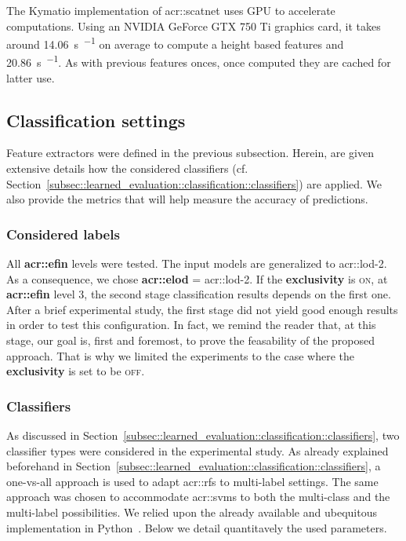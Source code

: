                 The Kymatio implementation of \gls{acr::scatnet} uses GPU to accelerate computations.
                Using an NVIDIA GeForce GTX 750 Ti graphics card, it takes around \SI{14.06}{\s \per \building} on average to compute a height based features and \SI{20.86}{\s \per \building}.
                As with previous features onces, once computed they are cached for latter use.

    \subsection{Classification settings}
        \label{subsec::experiments::setup::classification}
            Feature extractors were defined in the previous subsection.
            Herein, are given extensive details how the considered classifiers (cf. Section~\ref{subsec::learned_evaluation::classification::classifiers}) are applied.
            We also provide the metrics that will help measure the accuracy of predictions.

        \subsubsection{Considered labels}
            All \textbf{\gls{acr::efin}} levels were tested.
            The input models are generalized to \gls{acr::lod}-2.
            As a consequence, we chose \textbf{\gls{acr::elod}} = \gls{acr::lod}-2.
            If the \textbf{exclusivity} is \textsc{on}, at \textbf{\gls{acr::efin}} level 3, the second stage classification results depends on the first one.
            After a brief experimental study, the first stage did not yield good enough results in order to test this configuration.
            In fact, we remind the reader that, at this stage, our goal is, first and foremost, to prove the feasability of the proposed approach.
            That is why we limited the experiments to the case where the \textbf{exclusivity} is set to be \textsc{off}.

        \subsubsection{Classifiers}
            As discussed in Section~\ref{subsec::learned_evaluation::classification::classifiers}, two classifier types were considered in the experimental study.
            As already explained beforehand in Section~\ref{subsec::learned_evaluation::classification::classifiers}, a one-vs-all approach is used to adapt \glspl{acr::rf} to multi-label settings.
            The same approach was chosen to accommodate \glspl{acr::svm} to both the multi-class and the multi-label possibilities.
            We relied upon the already available and ubequitous implementation in Python~\parencite{scikit-learn}.
            Below we detail quantitavely the used parameters.
            
